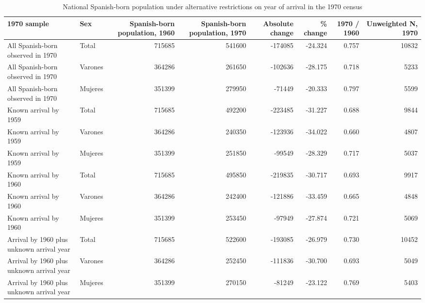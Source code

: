 \begin{table}

\caption{National Spanish-born population under alternative restrictions on year of arrival in the 1970 census}
\centering
\begin{tabular}[t]{llrrrrrr}
\toprule
1970 sample & Sex & Spanish-born population, 1960 & Spanish-born population, 1970 & Absolute change & \% change & 1970 / 1960 & Unweighted N, 1970\\
\midrule
All Spanish-born observed in 1970 & Total & 715685 & 541600 & -174085 & -24.324 & 0.757 & 10832\\
All Spanish-born observed in 1970 & Varones & 364286 & 261650 & -102636 & -28.175 & 0.718 & 5233\\
All Spanish-born observed in 1970 & Mujeres & 351399 & 279950 & -71449 & -20.333 & 0.797 & 5599\\
Known arrival by 1959 & Total & 715685 & 492200 & -223485 & -31.227 & 0.688 & 9844\\
Known arrival by 1959 & Varones & 364286 & 240350 & -123936 & -34.022 & 0.660 & 4807\\
\addlinespace
Known arrival by 1959 & Mujeres & 351399 & 251850 & -99549 & -28.329 & 0.717 & 5037\\
Known arrival by 1960 & Total & 715685 & 495850 & -219835 & -30.717 & 0.693 & 9917\\
Known arrival by 1960 & Varones & 364286 & 242400 & -121886 & -33.459 & 0.665 & 4848\\
Known arrival by 1960 & Mujeres & 351399 & 253450 & -97949 & -27.874 & 0.721 & 5069\\
Arrival by 1960 plus unknown arrival year & Total & 715685 & 522600 & -193085 & -26.979 & 0.730 & 10452\\
\addlinespace
Arrival by 1960 plus unknown arrival year & Varones & 364286 & 252450 & -111836 & -30.700 & 0.693 & 5049\\
Arrival by 1960 plus unknown arrival year & Mujeres & 351399 & 270150 & -81249 & -23.122 & 0.769 & 5403\\
\bottomrule
\end{tabular}
\end{table}
